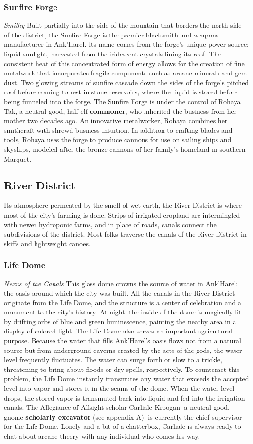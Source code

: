 \documentclass[10pt,a4,twoside,twocolumn,openany,nodeprecatedcode]{dndbook}
\begin{document}
\subsubsection{Sunfire Forge}
\textit{Smithy}
Built partially into the side of the mountain that borders the north side of the district, the Sunfire Forge is the premier blacksmith and weapons manufacturer in Ank'Harel. Its name comes from the forge's unique power source: liquid sunlight, harvested from the iridescent crystals lining its roof. The consistent heat of this concentrated form of energy allows for the creation of fine metalwork that incorporates fragile components such as arcane minerals and gem dust. Two glowing streams of sunfire cascade down the sides of the forge's pitched roof before coming to rest in stone reservoirs, where the liquid is stored before being funneled into the forge.
The Sunfire Forge is under the control of Rohaya Tak, a neutral good, half-elf \textbf{commoner}, who inherited the business from her mother two decades ago. An innovative metalworker, Rohaya combines her smithcraft with shrewd business intuition. In addition to crafting blades and tools, Rohaya uses the forge to produce cannons for use on sailing ships and skyships, modeled after the bronze cannons of her family's homeland in southern Marquet.
\subsection{River District}
Its atmosphere permeated by the smell of wet earth, the River District is where most of the city's farming is done. Strips of irrigated cropland are intermingled with newer hydroponic farms, and in place of roads, canals connect the subdivisions of the district. Most folks traverse the canals of the River District in skiffs and lightweight canoes.
\subsubsection{Life Dome}
\textit{Nexus of the Canals}
This glass dome crowns the source of water in Ank'Harel: the oasis around which the city was built. All the canals in the River District originate from the Life Dome, and the structure is a center of celebration and a monument to the city's history. At night, the inside of the dome is magically lit by drifting orbs of blue and green luminescence, painting the nearby area in a display of colored light.
The Life Dome also serves an important agricultural purpose. Because the water that fills Ank'Harel's oasis flows not from a natural source but from underground caverns created by the acts of the gods, the water level frequently fluctuates. The water can surge forth or slow to a trickle, threatening to bring about floods or dry spells, respectively. To counteract this problem, the Life Dome instantly transmutes any water that exceeds the accepted level into vapor and stores it in the seams of the dome. When the water level drops, the stored vapor is transmuted back into liquid and fed into the irrigation canals.
The Allegiance of Allsight scholar Carliale Kroogan, a neutral good, gnome \textbf{scholarly excavator} (see appendix A), is currently the chief supervisor for the Life Dome. Lonely and a bit of a chatterbox, Carliale is always ready to chat about arcane theory with any individual who comes his way.
\end{document}
